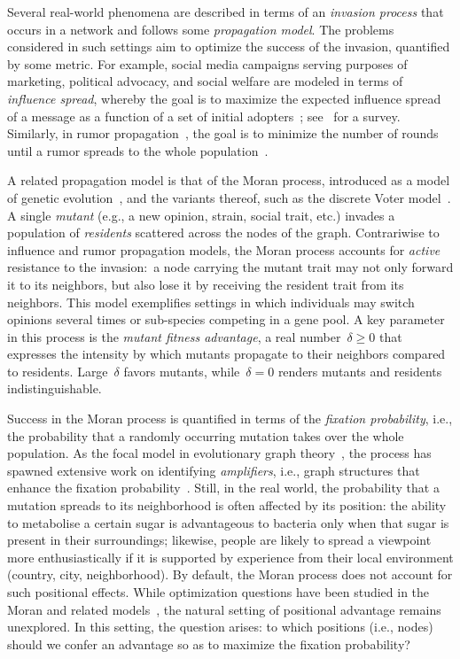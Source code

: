 \documentclass[letterpaper]{article}
\newcommand{\FitAdv}{\delta}
\begin{document}
Several real-world phenomena are described in terms of an \emph{invasion process} that occurs in a network and follows some \emph{propagation model}.
The problems considered in such settings aim to optimize the success of the invasion, quantified by some metric.
For example, social media campaigns serving purposes of marketing, political advocacy, and social welfare are modeled in terms of \emph{influence spread}, whereby the goal is to maximize the expected influence spread of a message as a function of a set of initial adopters~\cite{Kempe2003, Youze:2014, Borgs:2014:MSI, Tang:2015:IMN, Zhang2020}; see~\cite{IM-Survey} for a survey.
Similarly, in rumor propagation~\cite{Demers1987}, the goal is to minimize the number of rounds until a rumor
spreads to the whole population~\cite{Fountoulakis2012}.

A related propagation model is that of the Moran process, introduced as a model of genetic evolution~\cite{Moran1958}, and the variants thereof, such as the discrete Voter model~\cite{Clifford1973,Liggett1985, Antal2006, Talamali2021}.
A single \emph{mutant} (e.g., a new opinion, strain, social trait, etc.) invades a population of \emph{residents} scattered across the nodes of the graph.
Contrariwise to influence and rumor propagation models, the Moran process accounts for \emph{active} resistance to the invasion:~a node carrying the mutant trait may not only forward it to its neighbors, but also lose it by receiving the resident trait from its neighbors.
This model exemplifies settings in which individuals may switch opinions several times or sub-species competing in a gene pool.
A key parameter in this process is the \emph{mutant fitness advantage}, a real number~$\FitAdv\geq 0$ that expresses the intensity by which mutants propagate to their neighbors compared to residents. Large~$\FitAdv$ favors mutants, while~$\FitAdv=0$ renders mutants and residents indistinguishable.

Success in the Moran process is quantified in terms of the \emph{fixation probability}, i.e., the probability that a randomly occurring mutation takes over the whole population.
As the focal model in evolutionary graph theory~\cite{Lieberman2005}, the process has spawned extensive work on identifying \emph{amplifiers}, i.e., graph structures that enhance the fixation probability~\cite{Monk2014,Giakkoupis16,Galanis2017,Pavlogiannis2018,Tkadlec2021}.
Still, in the real world, the probability that a mutation spreads to its neighborhood is often affected by its position:
the ability to metabolise a certain sugar is advantageous to bacteria only when that sugar is present in their surroundings;
likewise, people are likely to spread a viewpoint more enthusiastically
if it is supported by experience from their local environment (country, city, neighborhood).
By default, the Moran process does not account for such positional effects.
While optimization questions have been studied in the Moran and related models~\cite{EvenDar2007}, the natural setting of positional advantage remains unexplored.
In this setting, the question arises: to which positions (i.e., nodes) should we confer an advantage so as to maximize the fixation probability?
\end{document}
